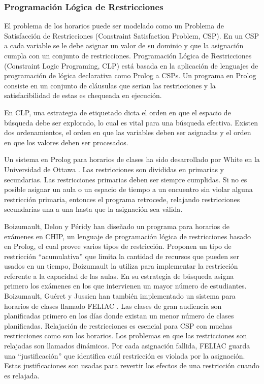 \subsubsection{Programación Lógica de Restricciones}

El problema de los horarios puede ser modelado como un Problema de Satisfacción de Restricciones (Constraint Satisfaction Problem, CSP). En un CSP a cada variable se le debe asignar un valor de su dominio y que la asignación cumpla con un conjunto de restricciones. Programación Lógica de Restricciones (Constraint Logic Programing, CLP) est\'a basada en la aplicación de lenguajes de programación de lógica declarativa como Prolog a CSPs. Un programa en Prolog consiste en un conjunto de cl\'ausulas que serian las restricciones y la satisfacibilidad de estas es chequeada en ejecución.

En CLP, una estrategia de etiquetado dicta el orden en que el espacio de búsqueda debe ser explorado, lo cual es vital para una búsqueda efectiva. Existen dos ordenamientos, el orden en que las variables deben ser asignadas y el orden en que los valores deben ser procesados.

Un sistema en Prolog para horarios de clases ha sido desarrollado por White en la Universidad de Ottawa \cite{L Kang and GM White, C Cheng and L Kang and N Leung and GM White}. Las restricciones son divididas en primarias y secundarias. Las restricciones primarias deben ser siempre cumplidas. Si no es posible asignar un aula o un espacio de tiempo a un encuentro sin violar alguna restricción primaria, entonces el programa retrocede, relajando restricciones secundarias una a una hasta que la asignación sea válida.

Boizumault, Delon y P\'eridy han diseñado un programa para horarios de exámenes \cite{P Boizumault and Y Delon and L Peridy} en CHIP, un lenguaje de programación lógica de restricciones basado en Prolog, el cual provee varios tipos de restricción. Proponen un tipo de restricción ``acumulativa'' que limita la cantidad de recursos que pueden ser usados en un tiempo, Boizumault la utiliza para implementar la restricción referente a la capacidad de las aulas. En su estrategia de búsqueda asigna primero los exámenes en los que intervienen un mayor número de estudiantes. Boizumault, Gu\'eret y Jussien han tambi\'en implementado un sistema para horarios de clases llamado FELIAC \cite{P Boizumault and C Gueret and N Jussien, C Gueret and N Jussien and P Boizumault and C Prins}. Las clases de gran audiencia son planificadas primero en los d\'ias donde existan un menor número de clases planificadas. Relajación de restricciones es esencial para CSP con muchas restricciones como son los horarios. Los problemas en que las restricciones son relajadas son llamados dinámicos. Por cada asignación fallida, FELIAC guarda una ``justificación'' que identifica cuál restricción es violada por la asignación. Estas justificaciones son usadas para revertir los efectos de una restricción cuando es relajada.

